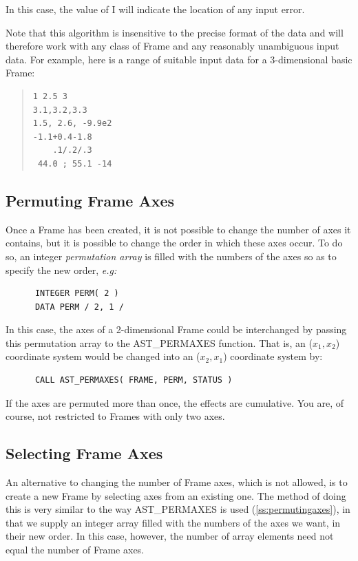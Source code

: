 \documentclass[twoside,11pt]{article}
\newcommand{\htmlref}[2]{#1}
\newcommand{\secref}[1]{\S\ref{#1}}
\renewcommand{\secref}[1]{\ref{#1}}
\begin{document}
In this case, the value of I will indicate the location of any input error.

Note that this algorithm is insensitive to the precise format of the
data and will therefore work with any class of Frame and any
reasonably unambiguous input data. For example, here is a range of
suitable input data for a 3-dimensional basic Frame:

\begin{quote}
\small
\begin{verbatim}
1 2.5 3
3.1,3.2,3.3
1.5, 2.6, -9.9e2
-1.1+0.4-1.8
    .1/.2/.3
 44.0 ; 55.1 -14
\end{verbatim}
\normalsize
\end{quote}

\subsection{\label{ss:permutingaxes}Permuting Frame Axes}

Once a \htmlref{Frame}{Frame} has been created, it is not possible to change the number
of axes it contains, but it is possible to change the order in which
these axes occur. To do so, an integer {\em{permutation array}} is
filled with the numbers of the axes so as to specify the new order,
{\em{e.g:}}

\small
\begin{verbatim}
      INTEGER PERM( 2 )
      DATA PERM / 2, 1 /
\end{verbatim}
\normalsize

In this case, the axes of a 2-dimensional Frame could be interchanged
by passing this permutation array to the \htmlref{AST\_PERMAXES}{AST_PERMAXES} function. That
is, an ($x_1,x_2$) coordinate system would be changed into an
($x_2,x_1$) coordinate system by:

\small
\begin{verbatim}
      CALL AST_PERMAXES( FRAME, PERM, STATUS )
\end{verbatim}
\normalsize

If the axes are permuted more than once, the effects are cumulative.
You are, of course, not restricted to Frames with only two axes.

\subsection{Selecting Frame Axes}

An alternative to changing the number of \htmlref{Frame}{Frame} axes, which is not
allowed, is to create a new Frame by selecting axes from an existing
one. The method of doing this is very similar to the way \htmlref{AST\_PERMAXES}{AST_PERMAXES}
is used (\secref{ss:permutingaxes}), in that we supply an integer
array filled with the numbers of the axes we want, in their new
order. In this case, however, the number of array elements need not
equal the number of Frame axes.
\end{document}

